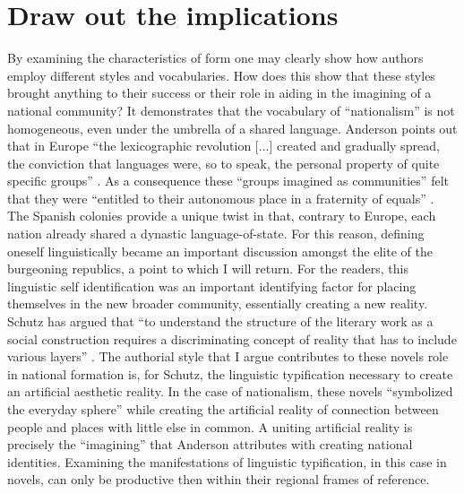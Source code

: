 \documentclass[12pt]{report}
\begin{document}
\section{Draw out the implications}
By examining the characteristics of form one may clearly show how authors employ different styles and vocabularies.
How does this show that these styles brought anything to their success or their role in aiding in the imagining of a national community?
It demonstrates that the vocabulary of \enquote{nationalism} is not homogeneous, even under the umbrella of a shared language.
Anderson points out that in Europe \enquote{the lexicographic revolution [...] created and gradually spread, the conviction that languages were, so to speak, the personal property of quite specific groups} \autocite[84]{Anderson2006}.
As a consequence these \enquote{groups imagined as communities} felt that they were \enquote{entitled to their autonomous place in a fraternity of equals} \autocite[84]{Anderson2006}.
The Spanish colonies provide a unique twist in that, contrary to Europe, each nation already shared a dynastic language-of-state.
For this reason, defining oneself linguistically became an important discussion amongst the elite of the burgeoning republics, a point to which I will return.
For the readers, this linguistic self identification was an important identifying factor for placing themselves in the new broader community, essentially creating a new reality.
Schutz has argued that \enquote{to understand the structure of the literary work as a social construction requires a discriminating concept of reality that has to include various layers} \autocite[79]{Embree1998}.
The authorial style that I argue contributes to these novels role in national formation is, for Schutz, the linguistic typification necessary to create an artificial aesthetic reality.
In the case of nationalism, these novels \enquote{symbolized the everyday sphere} while creating the artificial reality of connection between people and places with little else in common.
A uniting artificial reality is precisely the \enquote{imagining} that Anderson attributes with creating national identities. 
Examining the manifestations of linguistic typification, in this case in novels, can only be productive then within their regional frames of reference.
\end{document}
